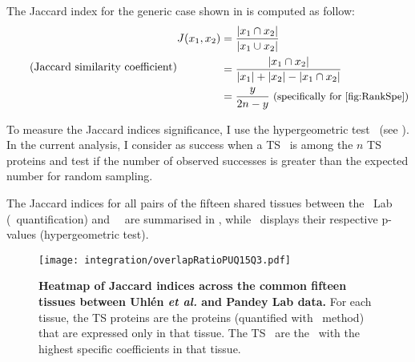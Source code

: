 \begin{minipage}{\textwidth}
    The Jaccard index for the generic case shown in 
    is computed as follow:
\begin{equation}
    \tag{Jaccard similarity coefficient}\label{eq:Jaccard}
    \begin{split}
        J(x_{1},x_{2}) & = \frac{\left | x_{1}\cap  x_{2}\right |}%
                                {\left | x_{1}\cup  x_{2}\right |}\\
                       & = \frac{\left | x_{1}\cap  x_{2}\right |}%
                                {\left | x_{1} \right | + \left | x_{2} \right |%
                                - \left | x_{1}\cap  x_{2}\right |}\\
                                & = \frac{y}{2n-y} \text{\small{~(specifically
                                for~\Cref{fig:RankSpe})}}\\
    \end{split}
    \raisetag{6cm}
\end{equation}
\end{minipage}

To measure the Jaccard indices significance,
I use the hypergeometric test~
(see ).
In the current analysis,
I consider as success when a \gls{TS} \mRNA\ is among the $n$ \gls{TS} proteins
and test if the number of observed successes is greater than
the expected number for random sampling.

\vspace{-2mm}
The Jaccard indices for all pairs of the fifteen shared tissues
between the \pandey\ Lab (\PPKM\ quantification) and \uhlen\ \etal\
are summarised in ,
while~ displays
their respective p-values (hypergeometric test).\mybr\

\begin{figure}[!ht]
    \texttt{[image: integration/overlapRatioPUQ15Q3.pdf]}\centering
    \vspace{-3mm}
    \caption[Heatmap of Jaccard indices across 15 tissues]{%
\label{fig:JaccardIndexes}\label{fig:RatioJac}\textbf{Heatmap of Jaccard indices
across the common fifteen tissues between Uhlén \textit{et al.} and Pandey Lab data.}
For each tissue, the \gls{TS} proteins are the proteins
(quantified with \PPKM\ method) that are expressed only in that tissue.
The \gls{TS} \mRNAs\ are the \mRNAs\ with the highest specific coefficients
in that tissue.}
\end{figure}

